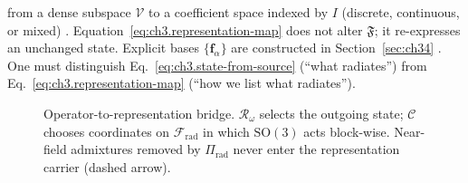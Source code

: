 from a dense subspace \(\mathcal{V}\) to a coefficient space indexed by \(I\) (discrete, continuous, or mixed) \cite{stratton1941}. Equation~\eqref{eq:ch3.representation-map} does not alter \(\mathfrak{F}\); it re-expresses an unchanged state. Explicit bases \(\{\mathbf{f}_\alpha\}\) are constructed in Section~\ref{sec:ch34} \cite{hansen1988}. One must distinguish Eq.~\eqref{eq:ch3.state-from-source} (``what radiates'') from Eq.~\eqref{eq:ch3.representation-map} (``how we list what radiates'').
\begin{figure}[t]
\centering
{}
\caption{Operator-to-representation bridge. \(\mathcal{R}_\omega\) selects the outgoing state;
\(\mathcal{C}\) chooses coordinates on \(\mathcal{F}_{\mathrm{rad}}\) in which \(\mathrm{SO}(3)\)
acts block-wise. Near-field admixtures removed by \(\Pi_{\mathrm{rad}}\) never enter the representation
carrier (dashed arrow).}
\label{fig:ch3.operator-representation-bridge}
\end{figure}

